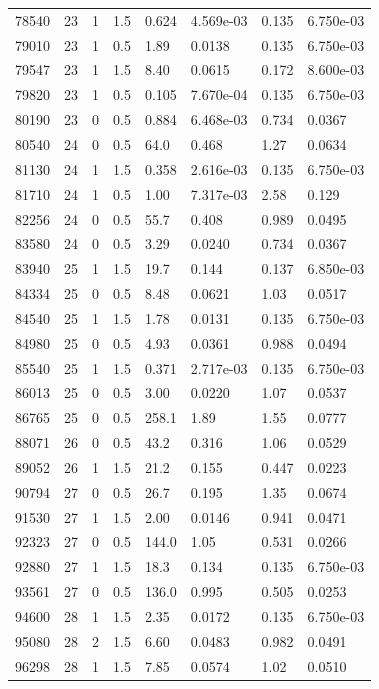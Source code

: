 \documentclass[preview]{standalone}
\begin{document}
{{{{{{\begin{tabular}{L{1.2cm}C{1.2cm} C{0.3cm}C{0.5cm} C{1.4cm}C{1.4cm} C{1.4cm}C{1.4cm}}
  78540  &    23  & 1     & 1.5 &  0.624  & 4.569e-03  & 0.135 &  6.750e-03   \\ 
  79010  &    23  & 1     & 0.5 &  1.89  & 0.0138  & 0.135 &  6.750e-03   \\ 
  79547  &    23  & 1     & 1.5 &  8.40  & 0.0615  & 0.172 &  8.600e-03   \\ 
  79820  &    23  & 1     & 0.5 &  0.105  & 7.670e-04  & 0.135 &  6.750e-03   \\ 
  80190  &    23  & 0     & 0.5 &  0.884  & 6.468e-03  & 0.734 &  0.0367   \\ 
  80540  &    24  & 0     & 0.5 &  64.0  & 0.468  & 1.27 &  0.0634   \\ 
  81130  &    24  & 1     & 1.5 &  0.358  & 2.616e-03  & 0.135 &  6.750e-03   \\ 
  81710  &    24  & 1     & 0.5 &  1.00  & 7.317e-03  & 2.58 &  0.129   \\ 
  82256  &    24  & 0     & 0.5 &  55.7  & 0.408  & 0.989 &  0.0495   \\ 
  83580  &    24  & 0     & 0.5 &  3.29  & 0.0240  & 0.734 &  0.0367   \\ 
  83940  &    25  & 1     & 1.5 &  19.7  & 0.144  & 0.137 &  6.850e-03   \\ 
  84334  &    25  & 0     & 0.5 &  8.48  & 0.0621  & 1.03 &  0.0517   \\ 
  84540  &    25  & 1     & 1.5 &  1.78  & 0.0131  & 0.135 &  6.750e-03   \\ 
  84980  &    25  & 0     & 0.5 &  4.93  & 0.0361  & 0.988 &  0.0494   \\ 
  85540  &    25  & 1     & 1.5 &  0.371  & 2.717e-03  & 0.135 &  6.750e-03   \\ 
  86013  &    25  & 0     & 0.5 &  3.00  & 0.0220  & 1.07 &  0.0537   \\ 
  86765  &    25  & 0     & 0.5 &  258.1  & 1.89  & 1.55 &  0.0777   \\ 
  88071  &    26  & 0     & 0.5 &  43.2  & 0.316  & 1.06 &  0.0529   \\ 
  89052  &    26  & 1     & 1.5 &  21.2  & 0.155  & 0.447 &  0.0223   \\ 
  90794  &    27  & 0     & 0.5 &  26.7  & 0.195  & 1.35 &  0.0674   \\ 
  91530  &    27  & 1     & 1.5 &  2.00  & 0.0146  & 0.941 &  0.0471   \\ 
  92323  &    27  & 0     & 0.5 &  144.0  & 1.05  & 0.531 &  0.0266   \\ 
  92880  &    27  & 1     & 1.5 &  18.3  & 0.134  & 0.135 &  6.750e-03   \\ 
  93561  &    27  & 0     & 0.5 &  136.0  & 0.995  & 0.505 &  0.0253   \\ 
  94600  &    28  & 1     & 1.5 &  2.35  & 0.0172  & 0.135 &  6.750e-03   \\ 
  95080  &    28  & 2     & 1.5 &  6.60  & 0.0483  & 0.982 &  0.0491   \\ 
  96298  &    28  & 1     & 1.5 &  7.85  & 0.0574  & 1.02 &  0.0510   \\ 
\hline 
\end{tabular} 

}}}}}}
\end{document}
